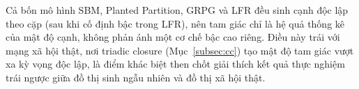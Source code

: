 \begin{remark}
\label{rem:random-triangle}
Cả bốn mô hình SBM, Planted Partition, GRPG và LFR đều sinh cạnh độc lập theo cặp (sau khi cố định bậc trong LFR), nên tam giác chỉ là hệ quả thống kê của mật độ cạnh, không phản ánh một cơ chế bậc cao riêng. Điều này trái với mạng xã hội thật, nơi triadic closure (Mục~\ref{subsec:cc}) tạo mật độ tam giác vượt xa kỳ vọng độc lập, là điểm khác biệt then chốt giải thích kết quả thực nghiệm trái ngược giữa đồ thị sinh ngẫu nhiên và đồ thị xã hội thật.
\end{remark}
